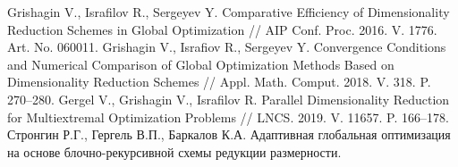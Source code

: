 \documentclass{svproc}
\begin{document}
\begin{thebibliography}{6}
	Grishagin V., Israfilov R., Sergeyev Y. Comparative Efficiency of Dimensionality Reduction Schemes in Global Optimization // AIP Conf. Proc. 2016. V. 1776. Art. No. 060011.
	Grishagin V., Israfiov R., Sergeyev Y. Convergence Conditions and Numerical Comparison of Global Optimization Methods Based on Dimensionality Reduction Schemes // Appl. Math. Comput. 2018. V. 318. P. 270--280.
	Gergel V., Grishagin V., Israfilov R. Parallel Dimensionality Reduction for Multiextremal Optimization Problems // LNCS. 2019. V. 11657. P. 166--178.
	Стронгин Р.Г., Гергель В.П., Баркалов К.А. Адаптивная глобальная оптимизация на основе блочно-рекурсивной схемы редукции размерности. 



\end{thebibliography}
\end{document}
